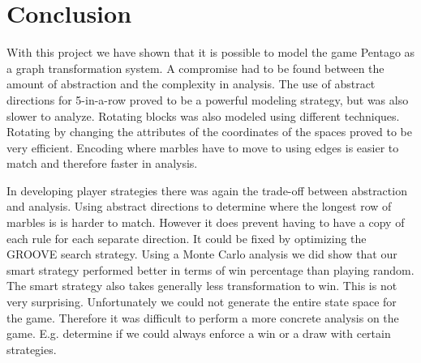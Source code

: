 \section{Conclusion}
\label{Conclusion}

With this project we have shown that it is possible to model the game Pentago as a graph transformation system.
A compromise had to be found between the amount of abstraction and the complexity in analysis. The use of abstract directions for 5-in-a-row proved to be a powerful modeling strategy, but was also slower to analyze. 
Rotating blocks was also modeled using different techniques. Rotating by changing the attributes of the coordinates of the spaces proved to be very efficient. Encoding where marbles have to move to using edges is easier to match and therefore faster in analysis.

In developing player strategies there was again the trade-off between abstraction and analysis. Using abstract directions to determine where the longest row of marbles is is harder to match. However it does prevent having to have a copy of each rule for each separate direction.
It could be fixed by optimizing the GROOVE search strategy.
Using a Monte Carlo analysis we did show that our smart strategy performed better in terms of win percentage than playing random. The smart strategy also takes generally less transformation to win. This is not very surprising.
Unfortunately we could not generate the entire state space for the game. Therefore it was difficult to perform a more concrete analysis on the game. E.g. determine if we could always enforce a win or a draw with certain strategies.
